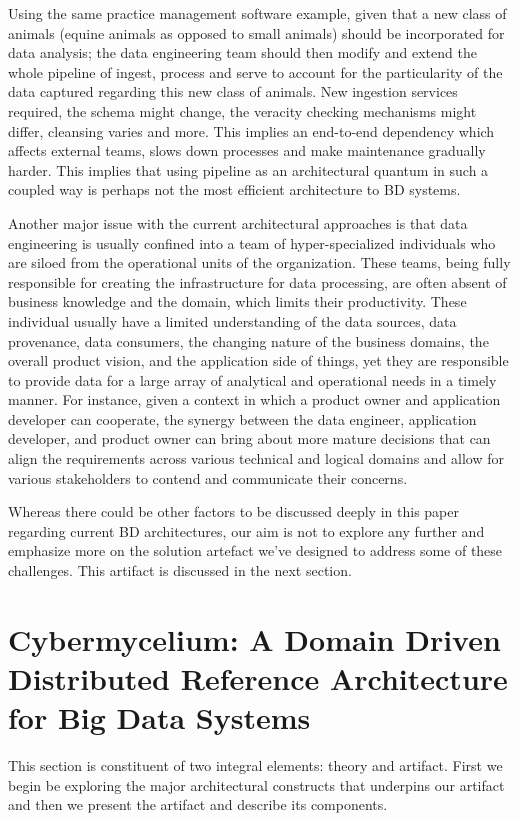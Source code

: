 \documentclass[review]{elsarticle}
\begin{document}
Using the same practice management software example, given that a new class of animals (equine animals as opposed to small animals) should be incorporated for data analysis; the data engineering team should then modify and extend the whole pipeline of ingest, process and serve to account for the particularity of the data captured regarding this new class of animals. New ingestion services required, the schema might change, the veracity checking mechanisms might differ, cleansing varies and more. This implies an end-to-end dependency which affects external teams, slows down processes and make maintenance gradually harder. This implies that using pipeline as an architectural quantum in such a coupled way is perhaps not the most efficient architecture to BD systems.

Another major issue with the current architectural approaches is that data engineering is usually confined into a team of hyper-specialized individuals who are siloed from the operational units of the organization. These teams, being fully responsible for creating the infrastructure for data processing, are often absent of business knowledge and the domain, which limits their productivity. These individual usually have a limited understanding of the data sources, data provenance, data consumers, the changing nature of the business domains, the overall product vision, and the application side of things, yet they are responsible to provide data for a large array of analytical and operational needs in a timely manner. For instance, given a context in which a product owner and application developer can cooperate, the synergy between the data engineer, application developer, and product owner can bring about more mature decisions that can align the requirements across various technical and logical domains and allow for various stakeholders to contend and communicate their concerns.

Whereas there could be other factors to be discussed deeply in this paper regarding current BD architectures, our aim is not to explore any further and emphasize more on the solution artefact we've designed to address some of these challenges. This artifact is discussed in the next section.

\section{Cybermycelium: A Domain Driven Distributed Reference Architecture for Big Data Systems}

This section is constituent of two integral elements: theory and artifact. First we begin be exploring the major architectural constructs that underpins our artifact and then we present the artifact and describe its components.
\end{document}
